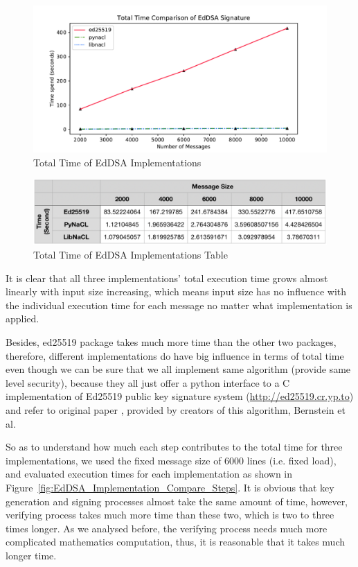\documentclass[10pt,sigconf]{acmart}
\begin{document}
\begin{figure}
\centering
\includegraphics[scale=0.45]{EdDSA_Implementation_Compare_Total}
\caption{\small{Total Time of EdDSA Implementations}}
\label{fig:EdDSA_Implementation_Compare_Total}
\end{figure}

\begin{figure}
\centering
\includegraphics[scale=0.4]{EdDSA_Implementation_Compare_Total_Table}
\caption{\small{Total Time of EdDSA Implementations Table}}
\label{fig:EdDSA_Implementation_Compare_Total_Table}
\end{figure}

It is clear that all three implementations' total execution time grows almost linearly with input size increasing, which means input size has no influence with the individual execution time for each message no matter what implementation is applied.

Besides, ed25519 package takes much more time than the other two packages, therefore, different implementations do have big influence in terms of total time even though we can be sure that we all implement same algorithm (provide same level security), because they all just offer a python interface to a C implementation of Ed25519 public key signature system (\url {http://ed25519.cr.yp.to}) and refer to original paper \cite{Bernstein2012}, provided by creators of this algorithm, Bernstein et al. 

So as to understand how much each step contributes to the total time for three implementations, we used the fixed message size of 6000 lines (i.e. fixed load), and evaluated execution times for each implementation as shown in Figure~\ref{fig:EdDSA_Implementation_Compare_Steps}. It is obvious that key generation and signing processes almost take the same amount of time, however, verifying process takes much more time than these two, which is two to three times longer. As we analysed before, the verifying process needs much more complicated mathematics computation, thus, it is reasonable that it takes much longer time.
\end{document}
